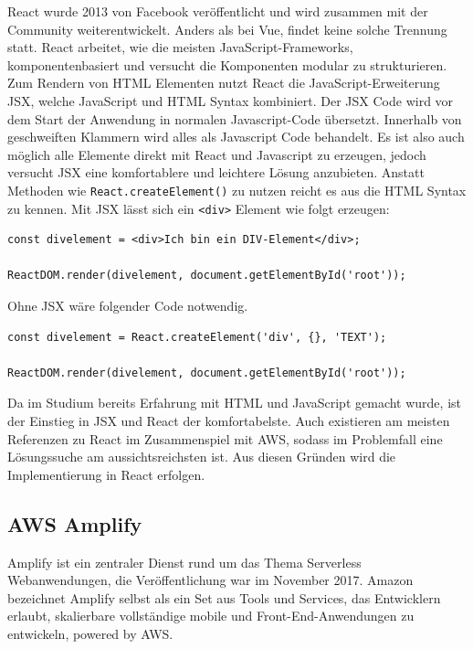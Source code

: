 {React wurde 2013 von Facebook veröffentlicht und wird zusammen mit der Community weiterentwickelt.
Anders als bei Vue, findet keine solche Trennung statt.
React arbeitet, wie die meisten JavaScript-Frameworks, komponentenbasiert und versucht die Komponenten modular zu strukturieren.
Zum Rendern von HTML Elementen nutzt React die JavaScript-Erweiterung JSX, welche JavaScript und HTML Syntax kombiniert.
Der JSX Code wird vor dem Start der Anwendung in normalen Javascript-Code übersetzt.
Innerhalb von geschweiften Klammern wird alles als Javascript Code behandelt.
Es ist also auch möglich alle Elemente direkt mit React und Javascript zu erzeugen, jedoch versucht JSX eine komfortablere und leichtere Lösung anzubieten.
Anstatt Methoden wie \verb+React.createElement()+ zu nutzen reicht es aus die HTML Syntax zu kennen.
Mit JSX lässt sich ein \verb+<div>+ Element wie folgt erzeugen:
\begin{lstlisting}[basicstyle=\ttfamily, breaklines=true , frame = single, backgroundcolor=\color{flashwhite} ]
const divelement = <div>Ich bin ein DIV-Element</div>;

ReactDOM.render(divelement, document.getElementById('root'));
\end{lstlisting}

Ohne JSX wäre folgender Code notwendig.\cite{JSX}
\begin{lstlisting}[basicstyle=\ttfamily, breaklines=true , frame = single, backgroundcolor=\color{flashwhite} ]
const divelement = React.createElement('div', {}, 'TEXT');

ReactDOM.render(divelement, document.getElementById('root'));
\end{lstlisting}


Da im Studium bereits Erfahrung mit HTML und JavaScript gemacht wurde, ist der Einstieg in JSX und React der komfortabelste.
Auch existieren am meisten Referenzen zu React im Zusammenspiel mit AWS, sodass im Problemfall eine Lösungssuche am aussichtsreichsten ist.
Aus diesen Gründen wird die Implementierung in React erfolgen.


\subsection{AWS Amplify}
\label{Amplify}

Amplify ist ein zentraler Dienst rund um das Thema Serverless Webanwendungen, die Veröffentlichung war im November 2017.
Amazon bezeichnet Amplify selbst als {}\glqq ein Set aus Tools und Services, das Entwicklern erlaubt, skalierbare vollständige
mobile und Front-End-Anwendungen zu entwickeln, powered by AWS.\grqq{}\cite{AWSAmplify}

}
